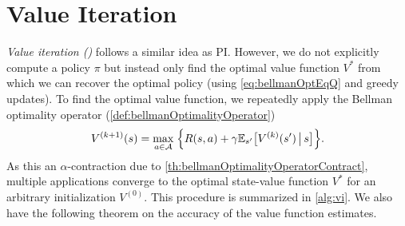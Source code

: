 	\section{Value Iteration}
		\emph{Value iteration ()} follows a similar idea as \ac{PI}. However, we do not explicitly compute a policy \(\pi\) but instead only find the optimal value function \(V^\ast\) from which we can recover the optimal policy (using \eqref{eq:bellmanOptEqQ} and greedy updates). To find the optimal value function, we repeatedly apply the Bellman optimality operator (\autoref{def:bellmanOptimalityOperator})
		\begin{equation}
			V^{(k + 1)}(s) = \max_{a \in \mathcal{A}} \;\Bigl\{ R(s, a) + \gamma \mathbb{E}_{s'}\bigl[ V^{(k)}(s') \,\big\vert\, s \bigr] \Bigr\}.
		\end{equation}
		As this an \(\alpha\)-contraction due to \autoref{th:bellmanOptimalityOperatorContract}, multiple applications converge to the optimal state-value function \(V^\ast\) for an arbitrary initialization \(V^{(0)}\). This procedure is summarized in \autoref{alg:vi}. We also have the following theorem on the accuracy of the value function estimates.

